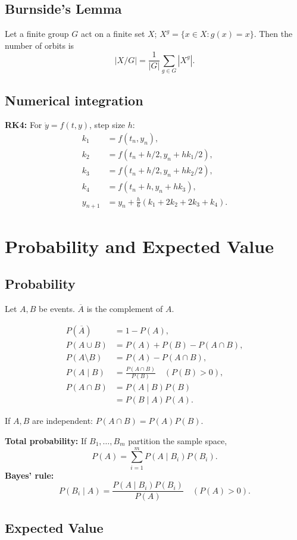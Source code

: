 \documentclass[portrait, 8pt, a4paper, oneside, twocolumn]{extarticle}
\begin{document}
\subsection{Burnside's Lemma}
Let a finite group $G$ act on a finite set $X$;
$X^g=\{x\in X:g(x)=x\}$.
Then the number of orbits is
\[
|X/G|=\frac{1}{|G|}\sum_{g\in G}|X^g|.
\]

\subsection{Numerical integration}
\textbf{RK4:} For $\dot y=f(t,y)$, step size $h$:
\begin{align*}
k_1&=f(t_n,y_n),\\
k_2&=f(t_n+h/2,y_n+hk_1/2),\\
k_3&=f(t_n+h/2,y_n+hk_2/2),\\
k_4&=f(t_n+h,y_n+hk_3),\\
y_{n+1}&=y_n+\frac h6(k_1+2k_2+2k_3+k_4).
\end{align*}

\section{Probability and Expected Value}

\subsection{Probability}

Let $A,B$ be events. $\overline A$ is the complement of $A$.

\begin{align*}
P(\overline A) &= 1-P(A),\\
P(A\cup B) &= P(A)+P(B)-P(A\cap B),\\
P(A\setminus B) &= P(A)-P(A\cap B),\\
P(A\mid B) &= \frac{P(A\cap B)}{P(B)} \quad (P(B)>0),\\
P(A\cap B) &= P(A\mid B)P(B)\\
              &= P(B\mid A)P(A).
\end{align*}

If $A,B$ are independent: $P(A\cap B)=P(A)P(B)$.

\textbf{Total probability:} If $B_1,\ldots,B_m$ partition the sample space,
\[
P(A)=\sum_{i=1}^{m}P(A\mid B_i)P(B_i).
\]
\textbf{Bayes' rule:}
\[
P(B_i\mid A)=\frac{P(A\mid B_i)P(B_i)}{P(A)} \quad (P(A)>0).
\]

\subsection{Expected Value}
\end{document}
